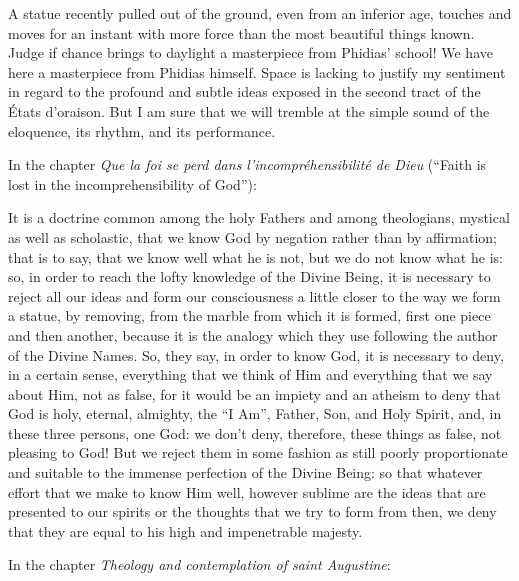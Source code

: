A statue recently pulled out of the ground, even from an inferior age, touches and moves for an instant with more force than the most beautiful things known. Judge if chance brings to daylight a masterpiece from Phidias' school! We have here a masterpiece from Phidias himself. Space is lacking to justify my sentiment in regard to the profound and subtle ideas exposed in the second tract of the États d’oraison. But I am sure that we will tremble at the simple sound of the eloquence, its rhythm, and its performance.

In the chapter \textit{Que la foi se perd dans l'incompréhensibilité de Dieu} (``Faith is lost in the incomprehensibility of God''):

\begin{quotex}
It is a doctrine common among the holy Fathers and among theologians, mystical as well as scholastic, that we know God by negation rather than by affirmation; that is to say, that we know well what he is not, but we do not know what he is: so, in order to reach the lofty knowledge of the Divine Being, it is necessary to reject all our ideas and form our consciousness a little closer to the way we form a statue, by removing, from the marble from which it is formed, first one piece and then another, because it is the analogy which they use following the author of the Divine Names. So, they say, in order to know God, it is necessary to deny, in a certain sense, everything that we think of Him and everything that we say about Him, not as false, for it would be an impiety and an atheism to deny that God is holy, eternal, almighty, the ``I Am'', Father, Son, and Holy Spirit, and, in these three persons, one God: we don’t deny, therefore, these things as false, not pleasing to God! But we reject them in some fashion as still poorly proportionate and suitable to the immense perfection of the Divine Being: so that whatever effort that we make to know Him well, however sublime are the ideas that are presented to our spirits or the thoughts that we try to form from then, we deny that they are equal to his high and impenetrable majesty.
\end{quotex}  

In the chapter \textit{Theology and contemplation of saint Augustine}:

